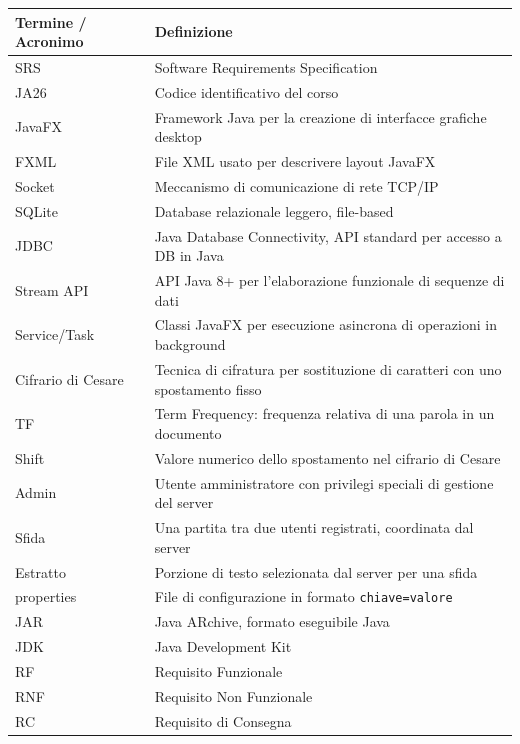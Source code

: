 \documentclass[12pt, a4paper]{article}
\newcommand{\code}[1]{\texttt{#1}}
\begin{document}
\begin{longtable}{|p{3.5cm}|p{10cm}|}
    \hline
    \rowcolor{primaryBlue!20}
    \textbf{Termine / Acronimo} & \textbf{Definizione} \\
    \hline
    \endhead
    SRS & Software Requirements Specification \\
    \hline
    JA26 & Codice identificativo del corso \\
    \hline
    JavaFX & Framework Java per la creazione di interfacce grafiche desktop \\
    \hline
    FXML & File XML usato per descrivere layout JavaFX \\
    \hline
    Socket & Meccanismo di comunicazione di rete TCP/IP \\
    \hline
    SQLite & Database relazionale leggero, file-based \\
    \hline
    JDBC & Java Database Connectivity, API standard per accesso a DB in Java \\
    \hline
    Stream API & API Java 8+ per l'elaborazione funzionale di sequenze di dati \\
    \hline
    Service/Task & Classi JavaFX per esecuzione asincrona di operazioni in background \\
    \hline
    Cifrario di Cesare & Tecnica di cifratura per sostituzione di caratteri con uno spostamento fisso \\
    \hline
    TF & Term Frequency: frequenza relativa di una parola in un documento \\
    \hline
    Shift & Valore numerico dello spostamento nel cifrario di Cesare \\
    \hline
    Admin & Utente amministratore con privilegi speciali di gestione del server \\
    \hline
    Sfida & Una partita tra due utenti registrati, coordinata dal server \\
    \hline
    Estratto & Porzione di testo selezionata dal server per una sfida \\
    \hline
    properties & File di configurazione in formato \code{chiave=valore} \\
    \hline
    JAR & Java ARchive, formato eseguibile Java \\
    \hline
    JDK & Java Development Kit \\
    \hline
    RF & Requisito Funzionale \\
    \hline
    RNF & Requisito Non Funzionale \\
    \hline
    RC & Requisito di Consegna \\
    \hline
\end{longtable}
\end{document}
